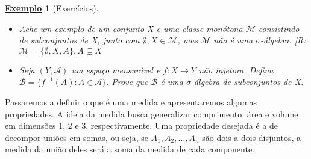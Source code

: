 \documentclass{article}
\newtheorem{example}{\underline{Exemplo}}
\begin{document}
\begin{example}[Exercícios]
	\begin{itemize}
		\item[1)] Ache um exemplo de um conjunto X e uma classe monótona \(\mathcal{M}\) consistindo de subconjuntos de X, junto com \(\emptyset , X\in \mathcal{M}\), mas \(\mathcal{M}\) não é uma \(\sigma \)-álgebra. [R: \(\mathcal{M} = \{\emptyset , X, A\}, A\subsetneq X\)
		\item[2)] Seja \((Y, \mathcal{A})\) um espaço mensurável e \(f:X\rightarrow Y\) não injetora. Defina \(\mathcal{B} = \{f^{-1}(A): A\in \mathcal{A}\}.\) Prove que \(\mathcal{B}\) é uma \(\sigma \)-álgebra de subconjuntos de X.
	\end{itemize}
\end{example}
Passaremos a definir o que é uma medida e apresentaremos algumas propriedades. A ideia da medida busca generalizar comprimento, área e volume em dimensões 1, 2 e 3, respectivamente. Uma propriedade desejada é a de decompor uniões em somas, ou seja,
se \(A_{1}, A_2, \dotsc , A_{n}\) são dois-a-dois disjuntos, a medida da união deles será a soma da medida de cada componente.
\end{document}
